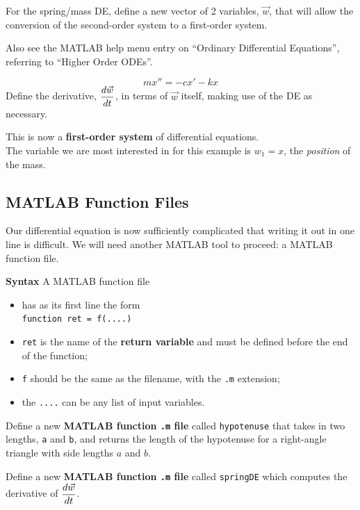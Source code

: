 \problem For the spring/mass DE, define a new vector of 2 variables,
$\vec{w}$, that will allow the conversion of the second-order system
to a first-order system.

\vfill

Also see the MATLAB help menu entry on ``Ordinary Differential
Equations'', referring to ``Higher Order ODEs''.

\newpage
$$ m  x'' = -c x' -kx $$
\problem Define the derivative, $\displaystyle \frac{d \vec{w}}{dt}$, in terms
of $\vec{w}$ itself, making use of the DE as necessary.

\vfill
\vfill

This is now a {\bf first-order system} of differential equations.  \\
The variable we are most interested in for this example is $w_1 = x$,
the {\em position} of the mass.

\newpage

\subsection*{MATLAB Function Files}

Our differential equation is now sufficiently complicated that writing
it out in one line is difficult.  We will need another MATLAB tool to
proceed: a MATLAB function file.


{\bf Syntax} A MATLAB function file
\begin{itemize}
\item has as its first line the form \\
\verb#function ret = f(....)# 
\item \verb#ret# is the name of the {\bf return variable} and must be
  defined before the end of the function;
\item \verb#f# should be the same as the filename, with the \verb#.m# extension;
\item the \verb#....# can be any list of input variables.
\end{itemize}

\newpage
\problem Define a new {\bf MATLAB function \texttt{.m} file} called
\verb#hypotenuse# that takes in two lengths, \verb#a# and \verb#b#,
and returns the length of the hypotenuse for a right-angle triangle
with side lengths $a$ and $b$.

\newpage
\problem Define a new {\bf MATLAB function \texttt{.m} file} called
\verb#springDE# which computes the derivative of
$\displaystyle \frac{d \vec{w}}{dt}$.

